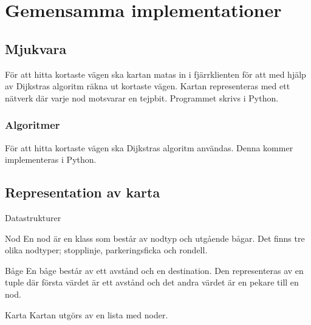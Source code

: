 \documentclass[designspec/spec.tex]{subfiles}
\begin{document}
\section{Gemensamma implementationer}

\subsection{Mjukvara}
För att hitta kortaste vägen ska kartan matas in i fjärrklienten för att med
hjälp av Dijkstras algoritm räkna ut kortaste vägen. Kartan representeras med
ett nätverk där varje nod motsvarar en tejpbit. Programmet skrivs i Python.

\subsubsection{Algoritmer}
För att hitta kortaste vägen ska Dijkstras algoritm användas. Denna kommer
implementeras i Python.

\subsection{Representation av karta}

\begin{labeling}{Datastrukturer}
    \item[Nod] En nod är en klass som består av nodtyp och utgående bågar. Det
    finns tre olika nodtyper; stopplinje, parkeringsficka och rondell.

    \item[Båge] En båge består av ett avstånd och en destination. Den
    representeras av en tuple där första värdet är ett avstånd och det andra
    värdet är en pekare till en nod.

    \item[Karta] Kartan utgörs av en lista med noder.
\end{labeling}
\end{document}
